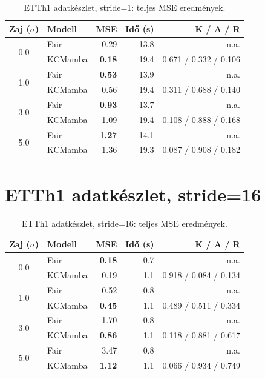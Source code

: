 \begin{table}[H]
    \centering
    \small
    \begin{tabular}{|c|l|r|r|r|}
        \hline
        \textbf{Zaj ($\sigma$)} & \textbf{Modell} & \textbf{MSE} & \textbf{Idő (s)} & \textbf{K / A / R} \\
        \hline\hline
        \multirow{2}{*}{0.0}
            & Fair      & 0.29 & 13.8 & n.a. \\
            & KCMamba & \textbf{0.18} & 19.4 & 0.671 / 0.332 / 0.106 \\
        \hline
        \multirow{2}{*}{1.0}
            & Fair      & \textbf{0.53} & 13.9 & n.a. \\
            & KCMamba & 0.56 & 19.4 & 0.311 / 0.688 / 0.140 \\
        \hline
        \multirow{2}{*}{3.0}
            & Fair      & \textbf{0.93} & 13.7 & n.a. \\
            & KCMamba & 1.09 & 19.4 & 0.108 / 0.888 / 0.168 \\
        \hline
        \multirow{2}{*}{5.0}
            & Fair      & \textbf{1.27} & 14.1 & n.a. \\
            & KCMamba & 1.36 & 19.3 & 0.087 / 0.908 / 0.182 \\
        \hline
    \end{tabular}
    \caption{ETTh1 adatkészlet, stride=1: teljes MSE eredmények.}
    \label{tab:full_etth1_s1}
\end{table}

\section{ETTh1 adatkészlet, stride=16}

\begin{table}[H]
    \centering
    \small
    \begin{tabular}{|c|l|r|r|r|}
        \hline
        \textbf{Zaj ($\sigma$)} & \textbf{Modell} & \textbf{MSE} & \textbf{Idő (s)} & \textbf{K / A / R} \\
        \hline\hline
        \multirow{2}{*}{0.0}
            & Fair      & \textbf{0.18} & 0.7 & n.a. \\
            & KCMamba & 0.19 & 1.1 & 0.918 / 0.084 / 0.134 \\
        \hline
        \multirow{2}{*}{1.0}
            & Fair      & 0.52 & 0.8 & n.a. \\
            & KCMamba & \textbf{0.45} & 1.1 & 0.489 / 0.511 / 0.334 \\
        \hline
        \multirow{2}{*}{3.0}
            & Fair      & 1.70 & 0.8 & n.a. \\
            & KCMamba & \textbf{0.86} & 1.1 & 0.118 / 0.881 / 0.617 \\
        \hline
        \multirow{2}{*}{5.0}
            & Fair      & 3.47 & 0.8 & n.a. \\
            & KCMamba & \textbf{1.12} & 1.1 & 0.066 / 0.934 / 0.749 \\
        \hline
    \end{tabular}
    \caption{ETTh1 adatkészlet, stride=16: teljes MSE eredmények.}
    \label{tab:full_etth1_s16}
\end{table}

